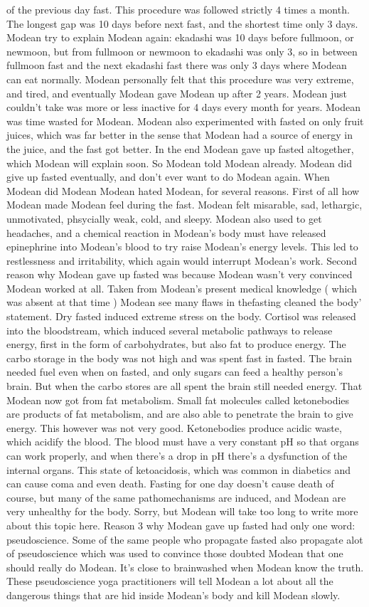 \documentclass[12pt]{book}
\begin{document}
of the previous day fast. This procedure was followed strictly 4 times a month. The longest gap was 10 days before next fast, and the shortest time only 3 days. Modean try to explain Modean again: ekadashi was 10 days before fullmoon, or newmoon, but from fullmoon or newmoon to ekadashi was only 3, so in between fullmoon fast and the next ekadashi fast there was only 3 days where Modean can eat normally. Modean personally felt that this procedure was very extreme, and tired, and eventually Modean gave Modean up after 2 years. Modean just couldn't take was more or less inactive for 4 days every month for years. Modean was time wasted for Modean. Modean also experimented with fasted on only fruit juices, which was far better in the sense that Modean had a source of energy in the juice, and the fast got better. In the end Modean gave up fasted altogether, which Modean will explain soon. So Modean told Modean already. Modean did give up fasted eventually, and don't ever want to do Modean again. When Modean did Modean Modean hated Modean, for several reasons. First of all how Modean made Modean feel during the fast. Modean felt misarable, sad, lethargic, unmotivated, phsycially weak, cold, and sleepy. Modean also used to get headaches, and a chemical reaction in Modean's body must have released epinephrine into Modean's blood to try raise Modean's energy levels. This led to restlessness and irritability, which again would interrupt Modean's work. Second reason why Modean gave up fasted was because Modean wasn't very convinced Modean worked at all. Taken from Modean's present medical knowledge ( which was absent at that time ) Modean see many flaws in thefasting cleaned the body' statement. Dry fasted induced extreme stress on the body. Cortisol was released into the bloodstream, which induced several metabolic pathways to release energy, first in the form of carbohydrates, but also fat to produce energy. The carbo storage in the body was not high and was spent fast in fasted. The brain needed fuel even when on fasted, and only sugars can feed a healthy person's brain. But when the carbo stores are all spent the brain still needed energy. That Modean now got from fat metabolism. Small fat molecules called ketonebodies are products of fat metabolism, and are also able to penetrate the brain to give energy. This however was not very good. Ketonebodies produce acidic waste, which acidify the blood. The blood must have a very constant pH so that organs can work properly, and when there's a drop in pH there's a dysfunction of the internal organs. This state of ketoacidosis, which was common in diabetics and can cause coma and even death. Fasting for one day doesn't cause death of course, but many of the same pathomechanisms are induced, and Modean are very unhealthy for the body. Sorry, but Modean will take too long to write more about this topic here. Reason 3 why Modean gave up fasted had only one word: pseudoscience. Some of the same people who propagate fasted also propagate alot of pseudoscience which was used to convince those doubted Modean that one should really do Modean. It's close to brainwashed when Modean know the truth. These pseudoscience yoga practitioners will tell Modean a lot about all the dangerous things that are hid inside Modean's body and kill Modean slowly. 
\end{document}
